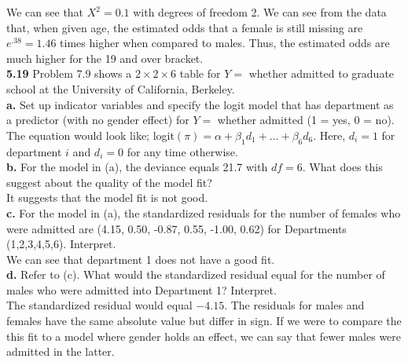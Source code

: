 \documentclass[paper=letter, fontsize=11pt]{scrartcl} %
\begin{document}
We can see that $X^2 = 0.1$ with degrees of freedom 2. We can see from the data that, when
given age, the estimated odds that a female is still missing are $e^{.38} = 1.46$ times higher when
compared to males. Thus, the estimated odds are much higher for the 19 and over bracket.
\\

\textbf{5.19} Problem 7.9 shows a $2 \times 2 \times 6$ table for $Y=$ whether admitted
to graduate school at the University of California, Berkeley. \\

\textbf{a.} Set up indicator variables and specify the logit model that has department
as a predictor (with no gender effect) for $Y=$ whether admitted (1 = yes, 0 = no).
\\

The equation would look like; logit$(\pi) = \alpha + \beta_1d_1 + \dots + \beta_6d_6$.
Here, $d_i = 1$ for department $i$ and $d_i = 0$ for any time otherwise.
\\

\textbf{b.} For the model in (a), the deviance equals 21.7 with $df = 6$. What does this
suggest about the quality of the model fit?
\\

It suggests that the model fit is not good.
\\

\textbf{c.} For the model in (a), the standardized residuals for the number of females
who were admitted are (4.15, 0.50, -0.87, 0.55, -1.00, 0.62) for Departments
(1,2,3,4,5,6). Interpret.
\\

We can see that department 1 does not have a good fit.
\\

\textbf{d.} Refer to (c). What would the standardized residual equal for the number of
males who were admitted into Department 1? Interpret.
\\

The standardized residual would equal $-4.15$. The residuals for males and females have
the same absolute value but differ in sign. If we were to compare the this fit to a model
where gender holds an effect, we can say that fewer males were admitted in the latter.
\\
\end{document}
